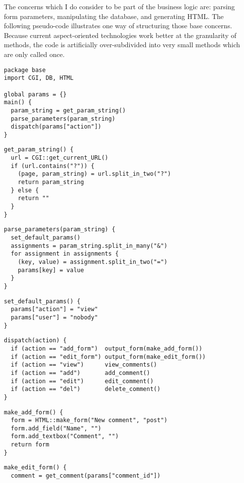 \documentclass{article}
\begin{document}
\begin{multicols}{2}
The concerns which I do consider to be part of the business logic are: parsing form parameters, manipulating the database, and generating HTML. The following pseudo-code illustrates one way of structuring those base concerns. Because current aspect-oriented technologies work better at the granularity of methods, the code is artificially over-subdivided into very small methods which are only called once.

{\smaller
\begin{verbatim}
package base
import CGI, DB, HTML

global params = {}
main() {
  param_string = get_param_string()
  parse_parameters(param_string)
  dispatch(params["action"])
}
\end{verbatim}

\begin{verbatim}
get_param_string() {
  url = CGI::get_current_URL()
  if (url.contains("?")) {
    (page, param_string) = url.split_in_two("?")
    return param_string
  } else {
    return ""
  }
}
\end{verbatim}

\begin{verbatim}
parse_parameters(param_string) {
  set_default_params()
  assignments = param_string.split_in_many("&")
  for assignment in assignments {
    (key, value) = assignment.split_in_two("=")
    params[key] = value
  }
}
\end{verbatim}

\begin{verbatim}
set_default_params() {
  params["action"] = "view"
  params["user"] = "nobody"
}
\end{verbatim}

\begin{verbatim}
dispatch(action) {
  if (action == "add_form")  output_form(make_add_form())
  if (action == "edit_form") output_form(make_edit_form())
  if (action == "view")      view_comments()
  if (action == "add")       add_comment()
  if (action == "edit")      edit_comment()
  if (action == "del")       delete_comment()
}
\end{verbatim}

\begin{verbatim}
make_add_form() {
  form = HTML::make_form("New comment", "post")
  form.add_field("Name", "")
  form.add_textbox("Comment", "")
  return form
}
\end{verbatim}

\begin{verbatim}
make_edit_form() {
  comment = get_comment(params["comment_id"])
  

\end{verbatim}}
\end{multicols}
\end{document}
